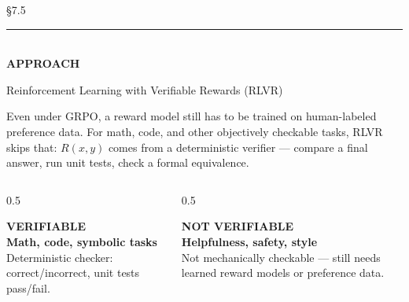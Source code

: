 \documentclass[aspectratio=169,11pt]{beamer}
\newcommand{\eyebrow}[2]{%
  \noindent{\scriptsize\sffamily\color{inkdim}\MakeUppercase{#1}}\hfill{\scriptsize\ttfamily\color{accentB}#2}\\[3pt]
  {\color{linecol}\rule{\linewidth}{0.6pt}}\\[13pt]%
}
\newcommand{\headline}[1]{{\usefont{T1}{ppl}{b}{n}\selectfont\LARGE\color{ink} #1}\par\vspace{10pt}}
\newcommand{\lede}[1]{{\normalsize\color{inkdim} #1}\par\vspace{6pt}}
\newcommand{\frametag}[2]{{\small\sffamily\bfseries\color{#1}\MakeUppercase{#2}}\par\vspace{4pt}}
\newcommand{\clabel}[2]{{\small\sffamily\bfseries\color{#1}\MakeUppercase{#2}}\\[4pt]}
\begin{document}
\begin{frame}
\eyebrow{RLVR \textperiodcentered\ 26}{\S7.5}
\frametag{accentB}{Approach}
\headline{Reinforcement Learning with Verifiable Rewards (RLVR)}
\lede{Even under GRPO, a reward model still has to be trained on human-labeled preference data. For math, code, and other objectively checkable tasks, RLVR skips that: $R(x,y)$ comes from a deterministic verifier --- compare a final answer, run unit tests, check a formal equivalence.}
\begin{columns}[T]
\begin{column}{0.5\textwidth}
\begin{cardB}[height=3.3cm]
\clabel{accentB}{Verifiable}
{\bfseries Math, code, symbolic tasks}\\[4pt]
{\small\color{inkdim}Deterministic checker: correct/incorrect, unit tests pass/fail.}
\end{cardB}
\end{column}
\begin{column}{0.5\textwidth}
\begin{card}[height=3.3cm]
\clabel{inkdim}{Not verifiable}
{\bfseries Helpfulness, safety, style}\\[4pt]
{\small\color{inkdim}Not mechanically checkable --- still needs learned reward models or preference data.}
\end{card}
\end{column}
\end{columns}
\end{frame}
\end{document}
